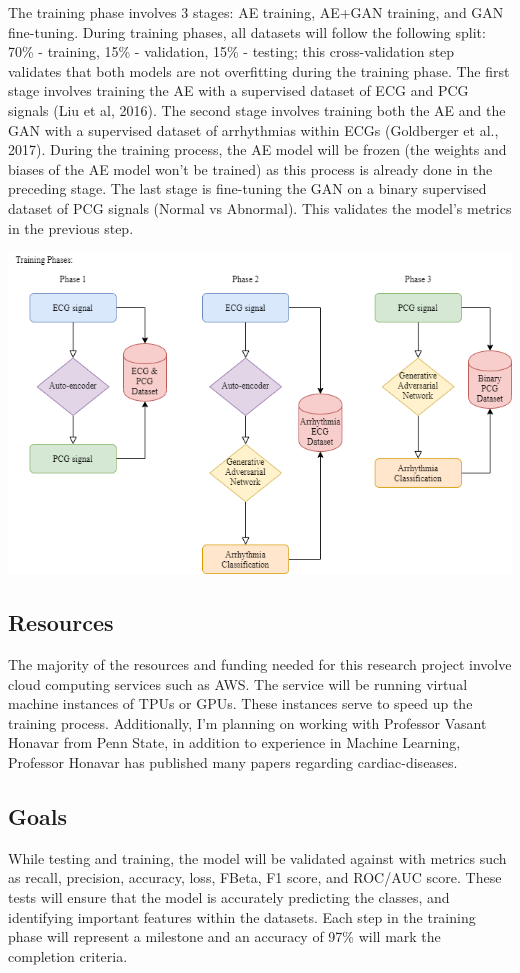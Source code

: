 \documentclass{article}
\begin{document}
The training phase involves 3 stages: AE training, AE+GAN training, and GAN fine-tuning. During training phases, all datasets will follow the following split: 70\% - training, 15\% - validation, 15\% - testing; this cross-validation step validates that both models are not overfitting during the training phase. The first stage involves training the AE with a supervised dataset of ECG and PCG signals (Liu et al, 2016). The second stage involves training both the AE and the GAN with a supervised dataset of arrhythmias within ECGs (Goldberger et al., 2017). During the training process, the AE model will be frozen (the weights and biases of the AE model won't be trained) as this process is already done in the preceding stage. The last stage is fine-tuning the GAN  on a binary supervised dataset of PCG signals (Normal vs Abnormal). This validates the model's metrics in the previous step.  
\begin{center}
    \includegraphics[scale=0.70]{training-digram}
\end{center}

\subsection{Resources}
The majority of the resources and funding needed for this research project involve cloud computing services such as AWS. The service will be running virtual machine instances of TPUs or GPUs. These instances serve to speed up the training process. Additionally, I'm planning on working with Professor Vasant Honavar from Penn State, in addition to experience in Machine Learning, Professor Honavar has published many papers regarding cardiac-diseases.

\subsection{Goals}
While testing and training, the model will be validated against with metrics such as recall, precision, accuracy, loss, FBeta, F1 score, and ROC/AUC score. These tests will ensure that the model is accurately predicting the classes, and identifying important features within the datasets. Each step in the training phase will represent a milestone and an accuracy of 97\% will mark the completion criteria.
\end{document}

